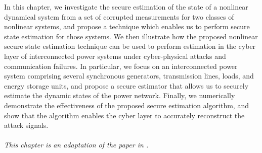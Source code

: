 \documentclass[../../thesis.tex]{subfiles}
\begin{document}
In this chapter, we investigate the secure estimation of the state of a nonlinear dynamical system from a set of corrupted measurements for two classes of nonlinear systems, and propose a technique which enables us to perform secure state estimation for those systems. 
We then illustrate how the proposed nonlinear secure state estimation technique can be used to perform estimation in the cyber layer of interconnected power systems under cyber-physical attacks and communication failures. 
In particular, we focus on an interconnected power system comprising several synchronous generators, transmission lines, loads, and energy storage units, and propose a secure estimator that allows us to securely estimate the dynamic states of the power network. 
Finally, we numerically demonstrate the effectiveness of the proposed secure estimation algorithm, and show that the algorithm enables the cyber layer to accurately reconstruct the attack signals.
%
%
\\
\\
\noindent
\textit{This chapter is an adaptation of the paper in \cite{Hu:2017powerjournal}.}
\end{document}
